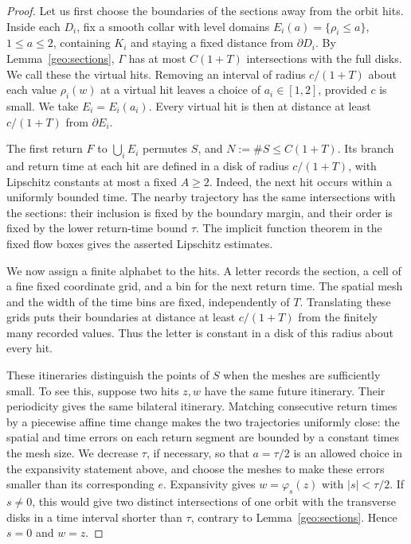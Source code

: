 \documentclass[10pt,oneside,reqno]{amsproc}
\numberwithin{equation}{section}
\theoremstyle{definition}
\theoremstyle{remark}
\renewcommand{\ge}{\geqslant}
\renewcommand{\le}{\leqslant}
\begin{document}
\begin{proof}
Let us first choose the boundaries of the sections away from the orbit hits. Inside each $D_i$, fix a smooth collar with level domains $E_i(a)=\{\rho_i\le a\}$, $1\le a\le2$, containing $K_i$ and staying a fixed distance from $\partial D_i$. By Lemma~\ref{geo:sections}, $\Gamma$ has at most $C(1+T)$ intersections with the full disks. We call these the virtual hits. Removing an interval of radius $c/(1+T)$ about each value $\rho_i(w)$ at a virtual hit leaves a choice of $a_i\in[1,2]$, provided $c$ is small. We take $E_i=E_i(a_i)$. Every virtual hit is then at distance at least $c/(1+T)$ from $\partial E_i$.

The first return $F$ to $\bigcup_iE_i$ permutes $S$, and $N:=\#S\le C(1+T)$. Its branch and return time at each hit are defined in a disk of radius $c/(1+T)$, with Lipschitz constants at most a fixed $A\ge2$. Indeed, the next hit occurs within a uniformly bounded time. The nearby trajectory has the same intersections with the sections: their inclusion is fixed by the boundary margin, and their order is fixed by the lower return-time bound $\tau$. The implicit function theorem in the fixed flow boxes gives the asserted Lipschitz estimates.

We now assign a finite alphabet to the hits. A letter records the section, a cell of a fine fixed coordinate grid, and a bin for the next return time. The spatial mesh and the width of the time bins are fixed, independently of $T$. Translating these grids puts their boundaries at distance at least $c/(1+T)$ from the finitely many recorded values. Thus the letter is constant in a disk of this radius about every hit.

These itineraries distinguish the points of $S$ when the meshes are sufficiently small. To see this, suppose two hits $z,w$ have the same future itinerary. Their periodicity gives the same bilateral itinerary. Matching consecutive return times by a piecewise affine time change makes the two trajectories uniformly close: the spatial and time errors on each return segment are bounded by a constant times the mesh size. We decrease $\tau$, if necessary, so that $a=\tau/2$ is an allowed choice in the expansivity statement above, and choose the meshes to make these errors smaller than its corresponding $e$. Expansivity gives $w=\varphi_s(z)$ with $|s|<\tau/2$. If $s\ne0$, this would give two distinct intersections of one orbit with the transverse disks in a time interval shorter than $\tau$, contrary to Lemma~\ref{geo:sections}. Hence $s=0$ and $w=z$.


\end{proof}
\end{document}
